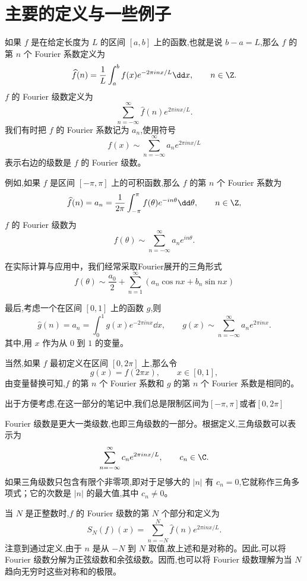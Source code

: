 \section{主要的定义与一些例子}
\begin{definition}
	如果 $f$ 是在给定长度为 $L$ 的区间 $[a,b]$ 上的函数,也就是说 $b-a=L$,那么 $f$ 的第 $n$ 个 Fourier 系数定义为
\[
\widehat f(n)=\frac1L\int_a^b f(x)e^{-2\pi i n x/L}\dd x,
\qquad n\in\Z .
\]
$f$ 的 Fourier 级数定义为
\[
\sum_{n=-\infty}^{\infty}\widehat f(n)e^{2\pi i n x/L}.
\]
我们有时把 $f$ 的 Fourier 系数记为 $a_n$,使用符号
\[
f(x)\sim \sum_{n=-\infty}^{\infty}a_n e^{2\pi i n x/L}
\]
表示右边的级数是 $f$ 的 Fourier 级数。

\end{definition}
例如,如果 $f$ 是区间 $[-\pi,\pi]$ 上的可积函数,那么 $f$ 的第 $n$ 个 Fourier 系数为
\[
\widehat f(n)=a_n
=\frac1{2\pi}\int_{-\pi}^{\pi}f(\theta)e^{-in\theta}\dd\theta,
\qquad n\in\Z,
\]
$f$ 的 Fourier 级数为
\[
f(\theta)
\sim \sum_{n=-\infty}^{\infty}a_n e^{in\theta}.
\]

在实际计算与应用中，我们经常采取Fourier展开的三角形式\[f(\theta)\sim \frac{a_0}{2}+\sum_{n=1}^{\infty}(a_n\cos nx+b_n\sin nx)\]

最后,考虑一个在区间 $[0,1]$ 上的函数 $g$,则
\[
\widehat g(n)=a_n
=\int_0^1 g(x)e^{-2\pi i n x}\dd x,
\qquad
g(x)\sim \sum_{n=-\infty}^{\infty}a_n e^{2\pi i n x}.
\]
其中,用 $x$ 作为从 $0$ 到 $1$ 的变量。

当然,如果 $f$ 最初定义在区间 $[0,2\pi]$ 上,那么令
\[
g(x)=f(2\pi x),\qquad x\in[0,1],
\]
由变量替换可知,$f$ 的第 $n$ 个 Fourier 系数和 $g$ 的第 $n$ 个 Fourier 系数是相同的。

出于方便考虑,在这一部分的笔记中,我们总是限制区间为$[-\pi,\pi]$或者$[0,2\pi]$


Fourier 级数是更大一类级数,也即三角级数的一部分。根据定义,三角级数可以表示为
\[
\sum_{n=-\infty}^{\infty}c_n e^{2\pi i n x/L},
\qquad c_n\in\C.
\]
如果三角级数只包含有限个非零项,即对于足够大的 $|n|$ 有 $c_n=0$,它就称作三角多项式；它的次数是 $|n|$ 的最大值,其中 $c_n\neq0$。

当 $N$ 是正整数时,$f$ 的 Fourier 级数的第 $N$ 个部分和定义为
\[
S_N(f)(x)=\sum_{n=-N}^{N}\widehat f(n)e^{2\pi i n x/L}.
\]
注意到通过定义,由于 $n$ 是从 $-N$ 到 $N$ 取值,故上述和是对称的。因此,可以将 Fourier 级数分解为正弦级数和余弦级数。因而,也可以将 Fourier 级数理解为当 $N$ 趋向无穷时这些对称和的极限。

